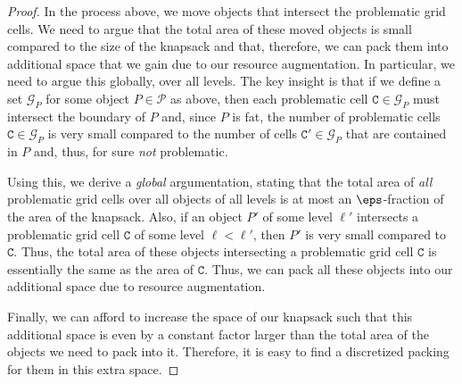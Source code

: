 \begin{proof}
	In the process above, we move objects that intersect the problematic grid
	cells. We need to argue that the total area of these moved objects
	is small compared to the size of the knapsack and that, therefore,
	we can pack them into additional space that we gain due to our resource
	augmentation. In particular, we need to argue this globally, over
	all levels. The key insight is that if we define a set $\mathcal{G}_{P}$
	for some object $P\in\mathcal{P}$ as above, then each problematic
	cell $\texttt{C}  \in\mathcal{G}_{P}$ must intersect the boundary of $P$ and,
	since $P$ is fat, the number of problematic cells $ \texttt{C} \in\mathcal{G}_{P}$
	is very small compared to the number of cells $\texttt{C}' \in\mathcal{G}_{P}$
	that are contained in $P$ and, thus, for sure \emph{not }problematic.
	
	
	
	
	Using this, we derive a \emph{global }argumentation, stating that
	the total area of \emph{all} problematic grid cells over all objects
	of all levels is at most an $\eps$-fraction of the area of the
	knapsack. Also, if an object $P'$ of some level $\ell'$ intersects
	a problematic grid cell $\texttt{C}$ of some level $\ell<\ell'$, then $P'$
	is very small compared to $\texttt{C}$. Thus, the total area of these objects
	intersecting a problematic grid cell $\texttt{C}$ is essentially the same
	as the area of $\texttt{C}$. Thus, we can pack all these objects into our
	additional space due to resource augmentation.
	
	Finally, we can afford to increase the space of our knapsack such
	that this additional space is even by a constant factor larger than
	the total area of the objects we need to pack into it. Therefore,
	it is easy to find a discretized packing for them in this extra space.
\end{proof}


